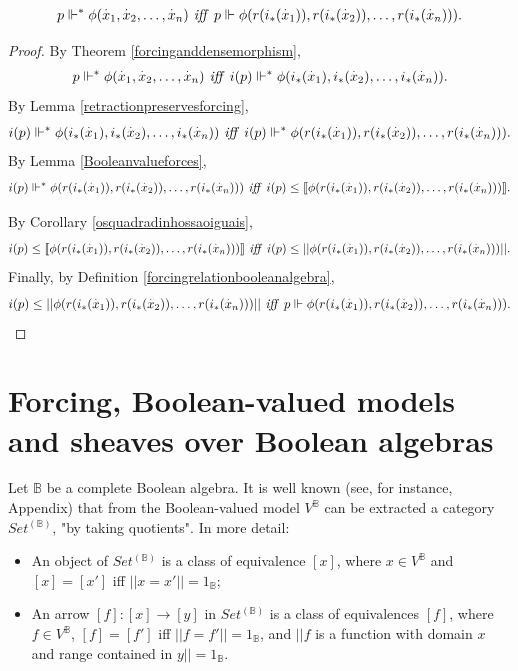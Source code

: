\documentclass[10pt,longbibliography]{article}
\newcommand{\B}{\mathbb{B}}
\newcommand{\xdot}{\overset{.}{x}}
\newcommand{\forces}{\Vdash^{*}}
\newcommand{\Forces}{\Vdash}
\newcommand{\lb}{\llbracket}
\newcommand{\rb}{\rrbracket}
\begin{document}
\begin{align*}	
	p \forces \phi(\xdot_{1},\xdot_{2},\dots,\xdot_{n}) \text{\emph{ iff }} p \Forces \phi(r(i_{*}(\xdot_{1})),r(i_{*}(\xdot_{2})),\dots,r(i_{*}(\xdot_{n}))).
\end{align*}

 \begin{proof}
 	By Theorem \ref{forcinganddensemorphism},
 	$$p \forces \phi(\xdot_{1},\xdot_{2},\dots,\xdot_{n}) \text{\emph{ iff }} i(p) \forces \phi(i_{*}(\xdot_{1}),i_{*}(\xdot_{2}),\dots,i_{*}(\xdot_{n})).$$
 	By Lemma \ref{retractionpreservesforcing},
 	$$i(p) \forces \phi(i_{*}(\xdot_{1}),i_{*}(\xdot_{2}),\dots,i_{*}(\xdot_{n}))\text{\emph{ iff }} i(p) \forces \phi(r(i_{*}(\xdot_{1})),r(i_{*}(\xdot_{2})),\dots,r(i_{*}(\xdot_{n}))).$$
 	By Lemma \ref{Booleanvalueforces},
 	$$i(p) \forces \phi(r(i_{*}(\xdot_{1})),r(i_{*}(\xdot_{2})),\dots,r(i_{*}(\xdot_{n})))\text{\emph{ iff }} i(p) \leq \lb\phi(r(i_{*}(\xdot_{1})),r(i_{*}(\xdot_{2})),\dots,r(i_{*}(\xdot_{n}))) \rb.$$
 	
 	By Corollary \ref{osquadradinhossaoiguais},
 	$$i(p) \leq \lb\phi(r(i_{*}(\xdot_{1})),r(i_{*}(\xdot_{2})),\dots,r(i_{*}(\xdot_{n}))) \rb\text{\emph{ iff }} i(p) \leq ||\phi(r(i_{*}(\xdot_{1})),r(i_{*}(\xdot_{2})),\dots,r(i_{*}(\xdot_{n})))||.$$
 	Finally, by {Definition \ref{forcingrelationbooleanalgebra}},
 	$$i(p) \leq ||\phi(r(i_{*}(\xdot_{1})),r(i_{*}(\xdot_{2})),\dots,r(i_{*}(\xdot_{n})))||\text{\emph{ iff }} p \Forces \phi(r(i_{*}(\xdot_{1})),r(i_{*}(\xdot_{2})),\dots,r(i_{*}(\xdot_{n}))).$$
 \end{proof}


 

 
\section{Forcing, Boolean-valued models and sheaves over Boolean algebras}\label{forcingmodelsandsheaves}



Let $\B$ be a complete Boolean algebra. It is well known (see, for instance, \cite{Bell05} Appendix) that from the Boolean-valued model $V^\B$ can be extracted a category  $Set^{(\B)}$, "by taking quotients". In more detail:
\begin{itemize}
\item An object of  $Set^{(\B)}$ is a class of equivalence $[x]$, where $x \in V^\B$ and $[x] = [x']$ iff $||x = x'|| = 1_{\B}$;
\item An arrow $[f] : [x] \to [y]$ in $Set^{(\B)}$ is a class of equivalences $[f]$, where $f \in V^\B$,  $[f] = [f']$ iff $||f = f'|| = 1_{\B}$, and $|| f$ is a function with domain $x$ and range contained in $y|| = 1_\B$. 
\end{itemize}
\end{document}
